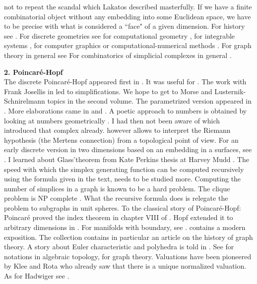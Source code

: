 \documentclass[12pt]{amsart}
\begin{document}
not to repeat the scandal which Lakatos described masterfully. If we have a finite combinatorial object without
any embedding into some Euclidean space, we have to be precise with what is considered a ``face" of a given dimension.
For history see \cite{Dieudonne1989}.  For discrete geometries see \cite{GSD,Regge,MarsdenDesbrun} for computational geometry 
\cite{Devadoss,ComputationalGeometry}, for integrable systems \cite{BobenkoSuris}, 
for computer graphics or computational-numerical methods \cite{Bobenko,Bobenko2008,CompElectro2002}. 
For graph theory in general see \cite{Diestel,HararyGraphTheory,Merris,BR}
For combinatorics of simplicial complexes in general \cite{May1967,Stanley86,RhodesSilva}.

{\bf 2. Poincar\'e-Hopf} \\

The discrete Poincar\'e-Hopf appeared first in \cite{poincarehopf}. It was useful for
\cite{KnillEnergy2020}.  The work with Frank Josellis in \cite{josellisknill} led to simplifications. We
hope to get to Morse and Lusternik-Schnirelmann topics in the second volume.
The parametrized version appeared in \cite{parametrizedpoincarehopf}.
More elaborations came in \cite{MorePoincareHopf} and \cite{PoincareHopfVectorFields}. 
A poetic approach to numbers is obtained by looking at numbers geometrically \cite{PrimesGraphsCohomology}.
I had then not been aware of \cite{Bjoerner2011} which introduced that complex already.
\cite{PrimesGraphsCohomology} however allows to interpret the Riemann hypothesis (the Mertens connection)
from a topological point of view. For an early discrete version in two dimensions based on an embedding
in a surfaces, see \cite{Glass1973}. I learned about Glass'theorem from Kate Perkins thesis
at Harvey Mudd \cite{KatePerkins}.
The speed with which the simplex generating function can be computed recursively using the formula
given in the text, needs to be studied more. Computing the number of simplices in a graph is 
known to be a hard problem. The clique problem is NP complete \cite{Karp}. What the recursive formula does is 
relegate the problem to subgraphs in unit spheres.
To the classical story of Poincar\'e-Hopf: 
Poincar\'e proved the index theorem in chapter VIII of \cite{poincare85}. Hopf extended it to
arbitrary dimensions in \cite{hopf26}. For manifolds with boundary, see \cite{Pugh1968}. 
\cite{Spivak5} contains a modern exposition.
The collection \cite{HistoryTopology} contains in particular an article on the history of 
graph theory. A story about Euler characteristic and polyhedra is told in \cite{Richeson,coxeter}.
See \cite{Hatcher,Spanier,Rotman} for
notations in algebraic topology, \cite{HararyGraphTheory,Biggs,BM} for graph theory.
Valuations have been pioneered by Klee \cite{Klee63} and Rota \cite{Rota71} who already saw that
there is a unique normalized valuation. As for Hadwiger see \cite{hadwiger, Klain1995}.
\end{document}
